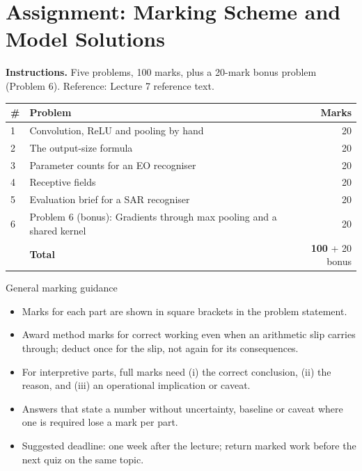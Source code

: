 \documentclass[11pt]{article}
\begin{document}
\section{Assignment: Marking Scheme and Model Solutions}

\textbf{Instructions.} Five problems, 100 marks, plus a 20-mark bonus problem (Problem 6). Reference: Lecture 7 reference text.

\begin{center}\small\renewcommand{\arraystretch}{1.25}\begin{tabularx}{0.85\textwidth}{@{}l X r@{}}\toprule\textbf{\#} & \textbf{Problem} & \textbf{Marks}\\\midrule1 & Convolution, ReLU and pooling by hand & 20\\
2 & The output-size formula & 20\\
3 & Parameter counts for an EO recogniser & 20\\
4 & Receptive fields & 20\\
5 & Evaluation brief for a SAR recogniser & 20\\
6 & Problem 6 (bonus): Gradients through max pooling and a shared kernel & 20\\\midrule & \textbf{Total} & \textbf{100} + 20 bonus\\\bottomrule\end{tabularx}\end{center}

\begin{instr}{General marking guidance}\begin{itemize}
\item Marks for each part are shown in square brackets in the problem statement.
\item Award method marks for correct working even when an arithmetic slip carries through; deduct once for the slip, not again for its consequences.
\item For interpretive parts, full marks need (i) the correct conclusion, (ii) the reason, and (iii) an operational implication or caveat.
\item Answers that state a number without uncertainty, baseline or caveat where one is required lose a mark per part.
\item Suggested deadline: one week after the lecture; return marked work before the next quiz on the same topic.
\end{itemize}\end{instr}
\end{document}
